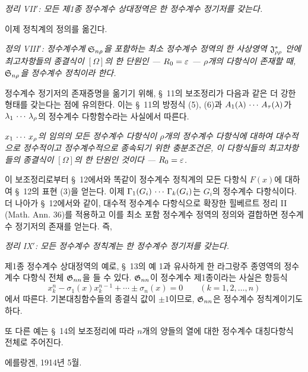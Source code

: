\emph{정리 VII$'$: 모든 제1종 정수계수 상대정역은 한 정수계수 정기저를 갖는다.}

이제 정칙계의 정의를 옮긴다.

\emph{정의 VIII$'$: 정수계수계 $\mathfrak S_{n\rho}$을 포함하는 최소 정수계수 정역의 한 사상영역 $\mathfrak J^*_{\rho\rho}$ 안에 최고차항들의 종결식이 $[\Omega]$의 한 단원인 --- $R_0=\varepsilon$ --- $\rho$개의 다항식이 존재할 때, $\mathfrak S_{n\rho}$을 정수계수 정칙이라 한다.}

정수계수 정기저의 존재증명을 옮기기 위해, \S\ 11의 보조정리가 다음과 같은 더 강한 형태를 갖는다는 점에 유의한다. 이는 \S\ 11의 방정식 (5), (6)과 $A_1(\lambda)\,\cdots\, A_\tau(\lambda)$가 $\lambda_1\,\cdots\,\lambda_\rho$의 정수계수 다항함수라는 사실에서 따른다.

\emph{$x_1\,\cdots\, x_\rho$의 임의의 모든 정수계수 다항식이 $\rho$개의 정수계수 다항식에 대하여 대수적으로 정수적이고 정수계수적으로 종속되기 위한 충분조건은, 이 다항식들의 최고차항들의 종결식이 $[\Omega]$의 한 단원인 것이다 --- $R_0=\varepsilon$.}

이 보조정리로부터 \S\ 12에서와 똑같이 정수계수 정칙계의 모든 다항식 $F(x)$에 대하여 \S\ 12의 표현 (3)을 얻는다. 이제 $\Gamma_1(G_i)\,\cdots\,\Gamma_k(G_i)$는 $G_i$의 정수계수 다항식이다. 더 나아가 \S\ 12에서와 같이, 대수적 정수계수 다항식으로 확장한 힐베르트 정리 II (Math. Ann. 36)를 적용하고 이를 최소 포함 정수계수 정역의 정의와 결합하면 정수계수 정기저의 존재를 얻는다. 즉,

\emph{정리 IX$'$: 모든 정수계수 정칙계는 한 정수계수 정기저를 갖는다.}

제1종 정수계수 상대정역의 예로, \S\ 13의 예 1과 유사하게 한 라그랑주 종영역의 정수계수 다항식 전체 $\mathfrak G_{nn}$을 들 수 있다. $\mathfrak G_{nn}$이 정수계수 제1종이라는 사실은 항등식
\[
  x_k^n-\sigma_1(x)x_k^{n-1}+\cdots\pm\sigma_n(x)=0
  \qquad(k=1,2,
\ldots,n)
\]
에서 따른다. 기본대칭함수들의 종결식 값이 $\pm1$이므로, $\mathfrak G_{nn}$은 정수계수 정칙계이기도 하다.

또 다른 예는 \S\ 14의 보조정리에 따라 $n$개의 양들의 열에 대한 정수계수 대칭다항식 전체로 주어진다.

에를랑겐, 1914년 5월.
